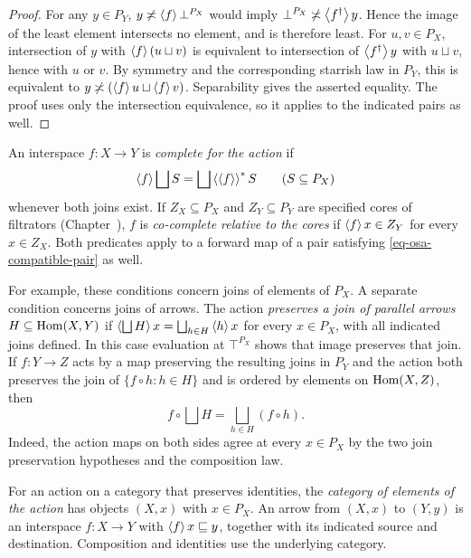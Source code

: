 \begin{proof}
For any $y\in P_Y$, $y\not\asymp\left\langle f\right\rangle\bot^{P_X}$ would imply
$\bot^{P_X}\not\asymp\left\langle f^\dagger\right\rangle y$. Hence the image of the least
element intersects no element, and is therefore least. For $u,v\in P_X$,
intersection of $y$ with $\left\langle f\right\rangle(u\sqcup v)$ is equivalent to
intersection of $\left\langle f^\dagger\right\rangle y$ with $u\sqcup v$, hence with
$u$ or $v$. By symmetry and the corresponding starrish law in $P_Y$,
this is equivalent to $y\not\asymp(\left\langle f\right\rangle u\sqcup\left\langle f\right\rangle v)$.
Separability gives the asserted equality. The proof uses only the
intersection equivalence, so it applies to the indicated pairs as well.
\end{proof}

\begin{defn}\label{def-osa-complete}
An interspace $f:X\to Y$ is \emph{complete for the action} if
\[
 \supfun{f}\bigsqcup S=\bigsqcup\rsupfun{\supfun{f}}S
 \qquad(S\subseteq P_X)
\]
whenever both joins exist. If $Z_X\subseteq P_X$ and $Z_Y\subseteq P_Y$
are specified cores of filtrators (Chapter~), $f$ is \emph{co-complete relative to
the cores} if $\left\langle f\right\rangle x\in Z_Y$ for every $x\in Z_X$.
Both predicates apply to a forward map of a pair satisfying
\eqref{eq-osa-compatible-pair} as well.
\end{defn}

For example, these conditions concern joins of elements of $P_X$.
A separate condition concerns joins of arrows. The action
\emph{preserves a join of parallel arrows} $H\subseteq\operatorname{Hom}(X,Y)$ if
$\supfun{\bigsqcup H}x=\bigsqcup_{h\in H}\supfun{h}x$
for every $x\in P_X$, with all indicated joins defined.
In this case evaluation at $\top^{P_X}$ shows that image preserves that
join. If $f:Y\to Z$ acts by a map preserving the resulting joins in
$P_Y$ and the action both preserves the join of $\{f\circ h:h\in H\}$
and is ordered by elements on $\operatorname{Hom}(X,Z)$, then
\[
 f\circ\bigsqcup H=\bigsqcup_{h\in H}(f\circ h).
\]
Indeed, the action maps on both sides agree at every $x\in P_X$ by
the two join preservation hypotheses and the composition law.

\begin{defn}\label{def-osa-element-category}
For an action on a category that preserves identities, the
\emph{category of elements of the action} has objects $(X,x)$
with $x\in P_X$. An arrow from $(X,x)$ to $(Y,y)$ is an
interspace $f:X\to Y$ with $\left\langle f\right\rangle x\sqsubseteq y$, together
with its indicated source and destination. Composition and
identities use the underlying category.
\end{defn}

